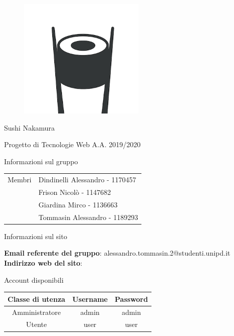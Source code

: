 \documentclass{article}
\begin{document}
	\begin{titlepage}
		\begin{figure}[http]
			\centering
			\includegraphics[width=6cm]{logo.jpg}
		\end{figure}
	
		\vspace*{2cm}
		
		{\huge\bfseries\centerline{Sushi Nakamura} }
		\centerline{Progetto di Tecnologie Web A.A. 2019/2020}
		
		\vspace*{1cm}
		{\bfseries \centerline{Informazioni sul gruppo}}
		\begin{center}
			\begin{tabular}{ c|l } 
				Membri & Dindinelli Alessandro - 1170457\\ 
				& Frison Nicolò - 1147682\\ 
				& Giardina Mirco - 1136663\\
				& Tommasin Alessandro - 1189293\\ 
			\end{tabular}
		\end{center}
		\vspace*{2cm}
		{\bfseries \centerline{Informazioni sul sito}}
		{\bfseries Email referente del gruppo}: alessandro.tommasin.2@studenti.unipd.it
		\newline
		{\bfseries Indirizzo web del sito}: 
		\newline
		{\bfseries \centerline{Account disponibili}}
		\begin{center}
			\begin{tabular}{ c|c|c } 
			\textbf{Classe di utenza} & \textbf{Username} & \textbf{Password} \\
				\hline
				 Amministratore &  admin &  admin  \\ 
				\hline
				 Utente &  user &  user  \\ 
				\hline
			\end{tabular}
		\end{center}
		\vspace*{\fill}
		
	\end{titlepage}
	
\end{document}
